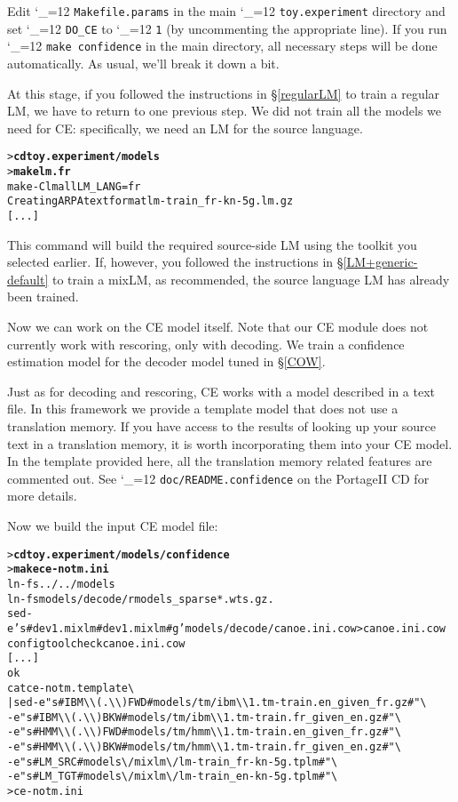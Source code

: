 \documentclass[11pt,letterpaper]{article}
\newcommand{\bs}{\textbackslash{}}
\newcommand{\PS}{PortageII\xspace}
\def\code{\begingroup\catcode`\_=12 \codex}
\newcommand{\codex}[1]{\texttt{#1}\endgroup}
\begin{document}
Edit \code{Makefile.params} in the main \code{toy.experiment} directory and set
\code{DO_CE} to \code{1} (by uncommenting the appropriate line).  If you run
\code{make confidence} in the main directory, all necessary steps will be done
automatically.  As usual, we'll break it down a bit.

At this stage, if you followed the instructions in \S\ref{regularLM} to train a
regular LM, we have to return to one previous step.  We did not train all the
models we need for CE: specifically, we need an LM for the source language.

\begin{small}
\begin{alltt}
   > \textbf{cd toy.experiment/models}
   > \textbf{make lm.fr}
   make -C lm all LM_LANG=fr
   Creating ARPA text format lm-train_fr-kn-5g.lm.gz
   [...]
\end{alltt}
\end{small}
This command will build the required source-side LM using the toolkit you
selected earlier.  If, however, you followed the instructions in
\S\ref{LM+generic-default} to train a mixLM, as recommended, the source language
LM has already been trained.

Now we can work on the CE model itself. Note that our CE module does not
currently work with rescoring, only with decoding. We train a confidence
estimation model for the decoder model tuned in \S\ref{COW}.

Just as for decoding and rescoring, CE works with a model described in a text
file.  In this framework we provide a template model that does not use a
translation memory.  If you have access to the results of looking up your
source text in a translation memory, it is worth incorporating them into your
CE model.  In the template provided here, all the translation memory related
features are commented out.  See \code{doc/README.confidence} on the \PS CD for
more details.

Now we build the input CE model file:
\begin{small}
\begin{alltt}
   > \textbf{cd toy.experiment/models/confidence}
   > \textbf{make ce-notm.ini}
   ln -fs ../../models
   ln -fs models/decode/rmodels_sparse*.wts.gz .
   sed -e 's#dev1.mixlm#dev1.mixlm#g' models/decode/canoe.ini.cow > canoe.ini.cow
   configtool check canoe.ini.cow
   [...]
   ok
   cat ce-notm.template \bs
      | sed -e "s#IBM\bs\bs(.\bs\bs)FWD#models/tm/ibm\bs\bs1.tm-train.en_given_fr.gz#" \bs
            -e "s#IBM\bs\bs(.\bs\bs)BKW#models/tm/ibm\bs\bs1.tm-train.fr_given_en.gz#" \bs
            -e "s#HMM\bs\bs(.\bs\bs)FWD#models/tm/hmm\bs\bs1.tm-train.en_given_fr.gz#" \bs
            -e "s#HMM\bs\bs(.\bs\bs)BKW#models/tm/hmm\bs\bs1.tm-train.fr_given_en.gz#" \bs
            -e "s#LM_SRC#models\bs/mixlm\bs/lm-train_fr-kn-5g.tplm#" \bs
            -e "s#LM_TGT#models\bs/mixlm\bs/lm-train_en-kn-5g.tplm#" \bs
      > ce-notm.ini
\end{alltt}
\end{small}
\end{document}
